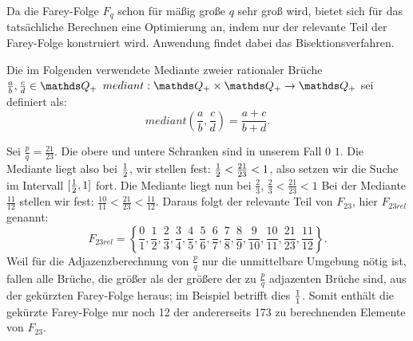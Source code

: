 Da die Farey-Folge $F_q$ schon für mäßig große $q$ sehr groß wird, bietet sich für das tatsächliche Berechnen eine Optimierung an, indem nur der relevante Teil der Farey-Folge konstruiert wird. Anwendung findet dabei das Bisektionsverfahren.
\begin{def1}\label{def:mediant}
	Die im Folgenden verwendete Mediante zweier rationaler Brüche $\frac{a}{b}, \frac{c}{d} \in \Q_+$ $mediant: \Q_+ \times \Q_+ \rightarrow \Q_+$ sei definiert als:
	$$mediant \left(\frac{a}{b}, \frac{c}{d}\right) = \frac{a+c}{b+d}.$$
\end{def1}
\begin{bsp}
	Sei $\frac{p}{q} = \frac{21}{23}$. Die obere und untere Schranken sind in unserem Fall $0$ \bzw $1$. Die Mediante liegt also bei $\frac{1}{2}$, wir stellen fest: $\frac{1}{2}<\frac{21}{23}<1$, also setzen wir die Suche im Intervall $[\frac{1}{2}, 1]$ fort. Die Mediante liegt nun bei $\frac{2}{3}$, $\frac{2}{3}<\frac{21}{23}<1$ \usw
	Bei der Mediante $\frac{11}{12}$ stellen wir fest: $\frac{10}{11} < \frac{21}{23} < \frac{11}{12}.$ Daraus folgt der relevante Teil von $F_{23}$, hier $F_{23rel}$ genannt: $$F_{23rel} = \left\{\frac{0}{1}, \frac{1}{2}, \frac{2}{3}, \frac{3}{4}, \frac{4}{5}, \frac{5}{6}, \frac{6}{7}, \frac{7}{8}, \frac{8}{9}, \frac{9}{10}, \frac{10}{11}, \frac{21}{23}, \frac{11}{12}\right\}.$$
	Weil für die Adjazenzberechnung von $\frac{p}{q}$ nur die unmittelbare Umgebung nötig ist, fallen alle Brüche, die größer als der größere der zu $\frac{p}{q}$ adjazenten Brüche sind, aus der gekürzten Farey-Folge heraus; im Beispiel betrifft dies $\frac{1}{1}$.
	Somit enthält die gekürzte Farey-Folge nur noch 12 der andererseits 173 zu berechnenden Elemente von $F_{23}$.
\end{bsp}

